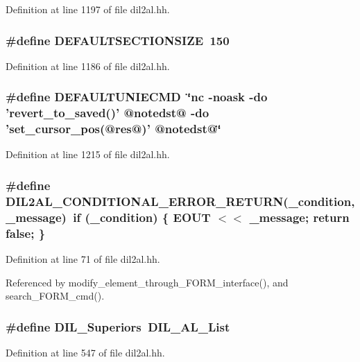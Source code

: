Definition at line 1197 of file dil2al.hh.
\subsubsection{\setlength{\rightskip}{0pt plus 5cm}\#define DEFAULTSECTIONSIZE\ 150}\label{dil2al_8hh_a39}




Definition at line 1186 of file dil2al.hh.
\subsubsection{\setlength{\rightskip}{0pt plus 5cm}\#define DEFAULTUNIECMD\ \char`\"{}nc -noask -do 'revert\_\-to\_\-saved()' @notedst@ -do 'set\_\-cursor\_\-pos(@{\bf res}@)' @notedst@\char`\"{}}\label{dil2al_8hh_a68}




Definition at line 1215 of file dil2al.hh.
\subsubsection{\setlength{\rightskip}{0pt plus 5cm}\#define DIL2AL\_\-CONDITIONAL\_\-ERROR\_\-RETURN(\_\-condition, \_\-message)\ if (\_\-condition) \{ EOUT $<$$<$ \_\-message; return {\bf false}; \}}\label{dil2al_8hh_a5}




Definition at line 71 of file dil2al.hh.

Referenced by modify\_\-element\_\-through\_\-FORM\_\-interface(), and search\_\-FORM\_\-cmd().
\subsubsection{\setlength{\rightskip}{0pt plus 5cm}\#define DIL\_\-Superiors\ {\bf DIL\_\-AL\_\-List}}\label{dil2al_8hh_a22}




Definition at line 547 of file dil2al.hh.

